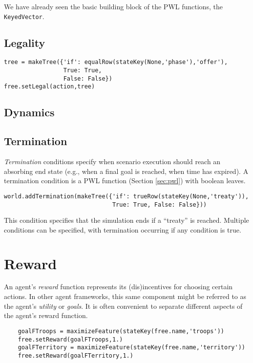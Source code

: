 \documentclass{article}
\begin{document}
We have already seen the basic building block of the PWL functions, the {\tt KeyedVector}. 

\subsection{Legality}\label{sec:legality}

\begin{verbatim}
tree = makeTree({'if': equalRow(stateKey(None,'phase'),'offer'),
                 True: True,    
                 False: False})
free.setLegal(action,tree)
\end{verbatim}

\subsection{Dynamics}\label{sec:dynamics}

\subsection{Termination}

{\em Termination} conditions specify when scenario execution should reach an absorbing end state (e.g., when a final goal is reached, when time has expired). A termination condition is a PWL function (Section \ref{sec:pwl}) with boolean leaves.

\begin{verbatim}
world.addTermination(makeTree({'if': trueRow(stateKey(None,'treaty')),
                               True: True, False: False}))
\end{verbatim}

This condition specifies that the simulation ends if a ``treaty'' is reached. Multiple conditions can be specified, with termination occurring if any condition is true.


\section{Reward}

An agent's {\em reward} function represents its (dis)incentives for choosing certain actions. In other agent frameworks, this same component might be referred to as the agent's {\em utility} or {\em goals}. It is often convenient to separate different aspects of the agent's reward function.

\begin{verbatim}
    goalFTroops = maximizeFeature(stateKey(free.name,'troops'))
    free.setReward(goalFTroops,1.)
    goalFTerritory = maximizeFeature(stateKey(free.name,'territory'))
    free.setReward(goalFTerritory,1.)
\end{verbatim}
\end{document}
